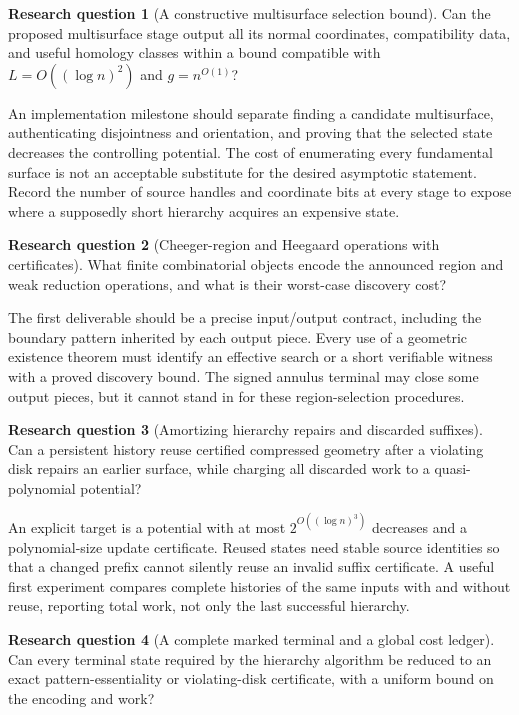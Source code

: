 \documentclass[11pt,a4paper]{article}
\theoremstyle{definition}
\newtheorem{question}{Research question}
\theoremstyle{remark}
\begin{document}
\begin{question}[A constructive multisurface selection bound]
Can the proposed multisurface stage output all its normal coordinates,
compatibility data, and useful homology classes within a bound compatible
with $L=O((\log n)^2)$ and $g=n^{O(1)}$?
\end{question}

An implementation milestone should separate finding a candidate
multisurface, authenticating disjointness and orientation, and proving
that the selected state decreases the controlling potential. The cost of
enumerating every fundamental surface is not an acceptable substitute for
the desired asymptotic statement. Record the number of source handles and
coordinate bits at every stage to expose where a supposedly short
hierarchy acquires an expensive state.

\begin{question}[Cheeger-region and Heegaard operations with certificates]
What finite combinatorial objects encode the announced region and weak
reduction operations, and what is their worst-case discovery cost?
\end{question}

The first deliverable should be a precise input/output contract, including
the boundary pattern inherited by each output piece. Every use of a
geometric existence theorem must identify an effective search or a short
verifiable witness with a proved discovery bound. The signed annulus
terminal may close some output pieces, but it cannot stand in for these
region-selection procedures.

\begin{question}[Amortizing hierarchy repairs and discarded suffixes]
Can a persistent history reuse certified compressed geometry after a
violating disk repairs an earlier surface, while charging all discarded
work to a quasi-polynomial potential?
\end{question}

An explicit target is a potential with at most
$2^{O((\log n)^3)}$ decreases and a polynomial-size update certificate.
Reused states need stable source identities so that a changed prefix cannot
silently reuse an invalid suffix certificate. A useful first experiment
compares complete histories of the same inputs with and without reuse,
reporting total work, not only the last successful hierarchy.

\begin{question}[A complete marked terminal and a global cost ledger]
Can every terminal state required by the hierarchy algorithm be reduced to
an exact pattern-essentiality or violating-disk certificate, with a uniform
bound on the encoding and work?
\end{question}
\end{document}
